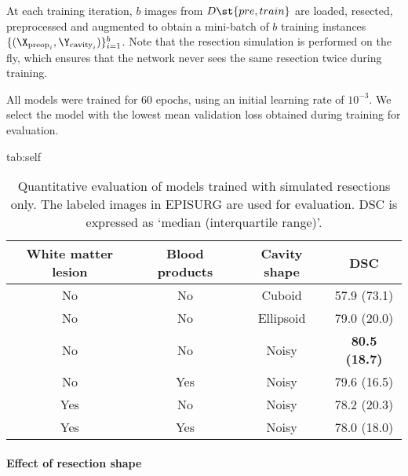 At each training iteration, $b$ images from $D\st{pre,train}$ are loaded, resected, preprocessed and augmented to obtain a mini-batch of $b$ training instances
$\{ ( \X_{\text{preop}_i}, \Y_{\text{cavity}_i}) \}_{i = 1}^{b}$.
Note that the resection simulation is performed on the fly, which ensures that the network never sees the same resection twice during training.

All models were trained for 60 epochs, using an initial learning rate of $10^{-3}$.
We select the model with the lowest mean validation loss obtained during training for evaluation.


\begin{table}[hb!]
    \centering
    \floatconts
    {tab:self}
    {\caption{%
        Quantitative evaluation of models trained with simulated resections only.
        The labeled images in EPISURG are used for evaluation.
        \ac{DSC} is expressed as `median (interquartile range)'.
    }}
    {
    \begin{tabular}{cccc}
        \toprule
        \centering \textbf{White matter lesion} &
        \centering \textbf{Blood products} &
        \centering \textbf{Cavity shape} &
        \textbf{DSC} \tabularnewline
        \midrule
                        No &                      No &                Cuboid &  57.9 (73.1)  \\  %
                        No &                      No &             Ellipsoid &  79.0 (20.0)  \\  %
                        No &                      No &                 Noisy &  \textbf{80.5 (18.7)}  \\  %
                        No &                     Yes &                 Noisy &  79.6 (16.5)  \\  %
                       Yes &                      No &                 Noisy &  78.2 (20.3)  \\  %
                       Yes &                     Yes &                 Noisy &  78.0 (18.0)  \\  %
        \bottomrule
    \end{tabular}
    }
\end{table}


\paragraph{Effect of resection shape}

